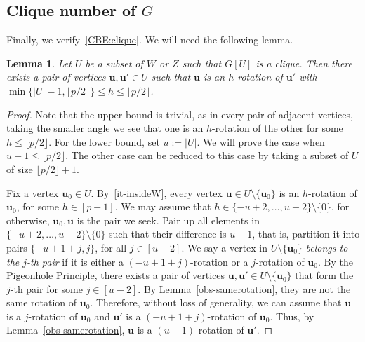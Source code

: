 \documentclass[11pt, a4paper]{article}
\newcommand{\V}[1]{\mathbold{#1}}
\newtheorem{lemma}[theorem]{Lemma}
\theoremstyle{definition}
\newcommand{\floor}[1]{\lfloor{#1}\rfloor}
\begin{document}
 
\subsection{Clique number of $G$}
Finally, we verify~\ref{CBE:clique}. 
We will need the following lemma. 

\begin{lemma}\label{lem-farpairs}
	Let $U$ be a subset of $W$ or $Z$ such that $G[U]$ is a clique. Then there exists a pair of vertices $\V{u},\V{u}'\in U$ such that $\V{u}$ is an $h$-rotation of $\V{u}'$ with $\min\{|U|-1, \floor{p/2}\}\le h\le \floor{p/2}$.
\end{lemma}
\begin{proof}
	Note that the upper bound is trivial, as in every pair of adjacent vertices, taking the smaller angle we see that one is an $h$-rotation of the other for some $h\le \floor{p/2}$. For the lower bound, set $u:=|U|$. We will prove the case when $u-1\le \floor{p/2}$. The other case can be reduced to this case by taking a subset of $U$ of size $\floor{p/2}+1$. 
	
	Fix a vertex $\V{u}_0\in U$. By~\ref{it-insideW},  every vertex $\V{u}\in U\setminus\{\V{u}_0\}$ is an $h$-rotation of $\V{u}_0$, for some $h\in[p-1]$. We may assume that $h\in \{-u+2,\ldots,u-2\}\setminus\{0\}$, for otherwise, $\V{u}_0,\V{u}$ is the pair we seek. Pair up all elements in $\{-u+2,\ldots,u-2\}\setminus\{0\}$ such that their difference is $u-1$, that is, partition it into pairs $\{-u+1+j,j\}$, for all $j\in [u-2]$. We say a vertex in $U\setminus\{\V{u}_0\}$ \emph{belongs to the $j$-th pair} if it is either a $(-u+1+j)$-rotation or a $j$-rotation of $\V{u}_0$. By the Pigeonhole Principle, there exists a pair of vertices $\V{u},\V{u}'\in U\setminus\{\V{u}_0\}$ that form the $j$-th pair for some $j\in[u-2]$. By Lemma~\ref{obs-samerotation}, they are not the same rotation of $\V{u}_0$. Therefore, without loss of generality, we can assume that $\V{u}$ is a $j$-rotation of $\V{u}_0$ and $\V{u}'$ is a $(-u+1+j)$-rotation of $\V{u}_0$. Thus, by Lemma~\ref{obs-samerotation}, $\V{u}$ is a $(u-1)$-rotation of $\V{u}'$.
\end{proof}
\end{document}
